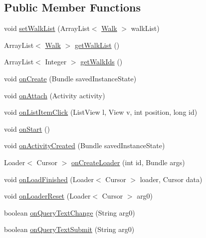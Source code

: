 \subsection*{Public Member Functions}
\begin{DoxyCompactItemize}
\item 
void \hyperlink{classuk_1_1ac_1_1swan_1_1digitaltrails_1_1fragments_1_1_walk_list_fragment_ad968cb36880ab53cdc99e690e09fc210}{set\+Walk\+List} (Array\+List$<$ \hyperlink{classuk_1_1ac_1_1swan_1_1digitaltrails_1_1components_1_1_walk}{Walk} $>$ walk\+List)
\item 
Array\+List$<$ \hyperlink{classuk_1_1ac_1_1swan_1_1digitaltrails_1_1components_1_1_walk}{Walk} $>$ \hyperlink{classuk_1_1ac_1_1swan_1_1digitaltrails_1_1fragments_1_1_walk_list_fragment_a88578ad55fa181c8d5af67f6a3edbb51}{get\+Walk\+List} ()
\item 
Array\+List$<$ Integer $>$ \hyperlink{classuk_1_1ac_1_1swan_1_1digitaltrails_1_1fragments_1_1_walk_list_fragment_ac3d1ef9d20e7e3c500e5acc5036b49d6}{get\+Walk\+Ids} ()
\item 
void \hyperlink{classuk_1_1ac_1_1swan_1_1digitaltrails_1_1fragments_1_1_walk_list_fragment_ae4b19c342bd6ba019426211406fca34d}{on\+Create} (Bundle saved\+Instance\+State)
\item 
void \hyperlink{classuk_1_1ac_1_1swan_1_1digitaltrails_1_1fragments_1_1_walk_list_fragment_aa4cfeab8620bfaeea0b9ef5937051299}{on\+Attach} (Activity activity)
\item 
void \hyperlink{classuk_1_1ac_1_1swan_1_1digitaltrails_1_1fragments_1_1_walk_list_fragment_a291d074057c67d05c205ca289e8e94b6}{on\+List\+Item\+Click} (List\+View l, View v, int position, long id)
\item 
void \hyperlink{classuk_1_1ac_1_1swan_1_1digitaltrails_1_1fragments_1_1_walk_list_fragment_ad30ec8ae4f8d54e6a8095fff4db011b1}{on\+Start} ()
\item 
void \hyperlink{classuk_1_1ac_1_1swan_1_1digitaltrails_1_1fragments_1_1_walk_list_fragment_acbecded42ffc4c86d8703c7d21f8b5ef}{on\+Activity\+Created} (Bundle saved\+Instance\+State)
\item 
Loader$<$ Cursor $>$ \hyperlink{classuk_1_1ac_1_1swan_1_1digitaltrails_1_1fragments_1_1_walk_list_fragment_aecc878e87887ae603b03326f08f838eb}{on\+Create\+Loader} (int id, Bundle args)
\item 
void \hyperlink{classuk_1_1ac_1_1swan_1_1digitaltrails_1_1fragments_1_1_walk_list_fragment_acecdf60308876436d77d84f87ab34bd2}{on\+Load\+Finished} (Loader$<$ Cursor $>$ loader, Cursor data)
\item 
void \hyperlink{classuk_1_1ac_1_1swan_1_1digitaltrails_1_1fragments_1_1_walk_list_fragment_a5ca7076480000e190fe35179c176120c}{on\+Loader\+Reset} (Loader$<$ Cursor $>$ arg0)
\item 
boolean \hyperlink{classuk_1_1ac_1_1swan_1_1digitaltrails_1_1fragments_1_1_walk_list_fragment_a86b797808137bdb4a3507a4180b1c81e}{on\+Query\+Text\+Change} (String arg0)
\item 
boolean \hyperlink{classuk_1_1ac_1_1swan_1_1digitaltrails_1_1fragments_1_1_walk_list_fragment_a741441f411b49a897294035b2d9f7538}{on\+Query\+Text\+Submit} (String arg0)
\end{DoxyCompactItemize}
